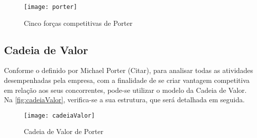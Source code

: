 \begin{figure}[H]
	\caption{\label{fig:porter}Cinco forças competitivas de Porter}
	\begin{center}
	    \texttt{[image: porter]}
	\end{center}
\end{figure}

\subsection{Cadeia de Valor}

Conforme o definido por Michael Porter (Citar), para analisar todas as atividades desempenhadas pela empresa, com a finalidade de se criar vantagem competitiva em relação aos seus concorrentes, pode-se utilizar o modelo da Cadeia de Valor. Na \autoref{fig:cadeiaValor}, verifica-se a sua estrutura, que será detalhada em seguida.

\begin{figure}[H]
	\caption{\label{fig:cadeiaValor}Cadeia de Valor de Porter}
	\begin{center}
	    \texttt{[image: cadeiaValor]}
	\end{center}
\end{figure}

